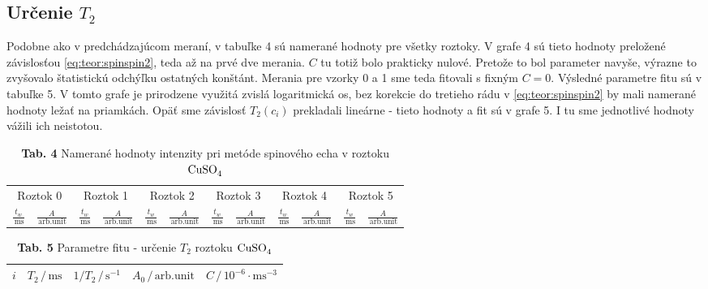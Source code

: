 \documentclass[a4paper, 10pt]{article}
\newcommand{\unit}[1]{\ensuremath{\, \mathrm{#1}}}
\begin{document}
\subsection*{Určenie $T_2$}
Podobne ako v predchádzajúcom meraní, v tabuľke 4 sú namerané hodnoty pre všetky roztoky. V grafe 4 sú tieto hodnoty preložené závislosťou \ref{eq:teor:spinspin2}, teda až na prvé dve merania. $C$ tu totiž bolo prakticky nulové. Pretože to bol parameter navyše, výrazne to zvyšovalo štatistickú odchýľku ostatných konštánt. Merania pre vzorky 0 a 1 sme teda fitovali s fixným $C = 0$. Výsledné parametre fitu sú v tabuľke 5. V tomto grafe je prirodzene využitá zvislá logaritmická os, bez korekcie do tretieho rádu v 
\ref{eq:teor:spinspin2} by mali namerané hodnoty ležať na priamkách.  Opäť sme závislosť $T_2(c_i)$ prekladali lineárne - tieto hodnoty a fit sú v grafe 5. I tu sme jednotlivé hodnoty vážili ich neistotou.
\begin{table}[t]
\centering
\begin{tabular}{c|c||c|c||c|c||c|c||c|c||c|c}
\multicolumn{2}{c||}{Roztok 0} & 
\multicolumn{2}{c||}{Roztok 1} & 
\multicolumn{2}{c||}{Roztok 2} & 
\multicolumn{2}{c||}{Roztok 3} & 
\multicolumn{2}{c||}{Roztok 4} & 
\multicolumn{2}{c}{Roztok 5} 
\\
$ \frac{t_w}{\unit{ms}} $ & 
$ \frac{A}{\unit{arb. unit}}$ &
$ \frac{t_w}{\unit{ms}} $ & 
$ \frac{A}{\unit{arb. unit}}$ &
$ \frac{t_w}{\unit{ms}} $ & 
$ \frac{A}{\unit{arb. unit}}$ &
$ \frac{t_w}{\unit{ms}} $ & 
$ \frac{A}{\unit{arb. unit}}$ &
$ \frac{t_w}{\unit{ms}} $ & 
$ \frac{A}{\unit{arb. unit}}$ &
$ \frac{t_w}{\unit{ms}} $ & 
$ \frac{A}{\unit{arb. unit}}$ 
\\
\midrule 

\end{tabular}
\newline
\vspace*{2pt}
\caption*{\textbf{ Tab. 4} Namerané hodnoty intenzity pri metóde spinového echa v roztoku $\ce{CuSO4}$}
\end{table}


\begin{table}[t]
\centering
\hspace*{30pt}
\begin{tabular}{c|c|c|c|c}
$ i $ & 
$ T_2\,/\unit{ms}$ &
$ 1/T_2\,/\unit{s^{-1}}$ &
$ A_0\,/\unit{arb. unit}$ &
$ C\,/\unit{10^{-6}\cdot ms^{-3}}$ 
\\
\midrule 

\end{tabular}
\newline
\vspace*{2pt}
\caption*{\textbf{ Tab. 5} Parametre fitu - určenie $T_2$ roztoku $\ce{CuSO4}$}
\end{table}
\end{document}

